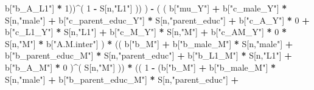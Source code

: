 \documentclass[
]{book}
\newenvironment{Shaded}{\begin{snugshade}}{\end{snugshade}}
\newcommand{\DecValTok}[1]{\textcolor[rgb]{0.00,0.00,0.81}{#1}}
\newcommand{\NormalTok}[1]{#1}
\newcommand{\SpecialCharTok}[1]{\textcolor[rgb]{0.81,0.36,0.00}{\textbf{#1}}}
\newcommand{\StringTok}[1]{\textcolor[rgb]{0.31,0.60,0.02}{#1}}
\begin{document}
\begin{Shaded}
\begin{Highlighting}[]
\NormalTok{                                   b[}\StringTok{"b\_A\_L1"}\NormalTok{] }\SpecialCharTok{*} \DecValTok{1}\NormalTok{))}\SpecialCharTok{\^{}}\NormalTok{( }\DecValTok{1} \SpecialCharTok{{-}}\NormalTok{ S[n,}\StringTok{"L1"}\NormalTok{] )) ) }\SpecialCharTok{{-}} 
\NormalTok{                      ( ( b[}\StringTok{"mu\_Y"}\NormalTok{] }\SpecialCharTok{+} 
\NormalTok{                            b[}\StringTok{"c\_male\_Y"}\NormalTok{] }\SpecialCharTok{*}\NormalTok{ S[n,}\StringTok{"male"}\NormalTok{] }\SpecialCharTok{+} 
\NormalTok{                            b[}\StringTok{"c\_parent\_educ\_Y"}\NormalTok{] }\SpecialCharTok{*}\NormalTok{ S[n,}\StringTok{"parent\_educ"}\NormalTok{] }\SpecialCharTok{+}
\NormalTok{                            b[}\StringTok{"c\_A\_Y"}\NormalTok{] }\SpecialCharTok{*} \DecValTok{0} \SpecialCharTok{+}
\NormalTok{                            b[}\StringTok{"c\_L1\_Y"}\NormalTok{] }\SpecialCharTok{*}\NormalTok{ S[n,}\StringTok{"L1"}\NormalTok{] }\SpecialCharTok{+}
\NormalTok{                            b[}\StringTok{"c\_M\_Y"}\NormalTok{] }\SpecialCharTok{*}\NormalTok{ S[n,}\StringTok{"M"}\NormalTok{] }\SpecialCharTok{+} 
\NormalTok{                            b[}\StringTok{"c\_AM\_Y"}\NormalTok{] }\SpecialCharTok{*} \DecValTok{0} \SpecialCharTok{*}\NormalTok{ S[n,}\StringTok{"M"}\NormalTok{] }\SpecialCharTok{*}\NormalTok{ b[}\StringTok{"A.M.inter"}\NormalTok{] ) }\SpecialCharTok{*}
\NormalTok{                          (( b[}\StringTok{"b\_M"}\NormalTok{] }\SpecialCharTok{+} 
\NormalTok{                               b[}\StringTok{"b\_male\_M"}\NormalTok{] }\SpecialCharTok{*}\NormalTok{ S[n,}\StringTok{"male"}\NormalTok{] }\SpecialCharTok{+} 
\NormalTok{                               b[}\StringTok{"b\_parent\_educ\_M"}\NormalTok{] }\SpecialCharTok{*}\NormalTok{ S[n,}\StringTok{"parent\_educ"}\NormalTok{] }\SpecialCharTok{+} 
\NormalTok{                               b[}\StringTok{"b\_L1\_M"}\NormalTok{] }\SpecialCharTok{*}\NormalTok{ S[n,}\StringTok{"L1"}\NormalTok{] }\SpecialCharTok{+}
\NormalTok{                               b[}\StringTok{"b\_A\_M"}\NormalTok{] }\SpecialCharTok{*} \DecValTok{0}\NormalTok{ )}\SpecialCharTok{\^{}}\NormalTok{( S[n,}\StringTok{"M"}\NormalTok{] )) }\SpecialCharTok{*}
\NormalTok{                          (( }\DecValTok{1} \SpecialCharTok{{-}}\NormalTok{ (b[}\StringTok{"b\_M"}\NormalTok{] }\SpecialCharTok{+} 
\NormalTok{                                    b[}\StringTok{"b\_male\_M"}\NormalTok{] }\SpecialCharTok{*}\NormalTok{ S[n,}\StringTok{"male"}\NormalTok{] }\SpecialCharTok{+} 
\NormalTok{                                    b[}\StringTok{"b\_parent\_educ\_M"}\NormalTok{] }\SpecialCharTok{*}\NormalTok{ S[n,}\StringTok{"parent\_educ"}\NormalTok{] }\SpecialCharTok{+} 

\end{Highlighting}
\end{Shaded}
\end{document}
